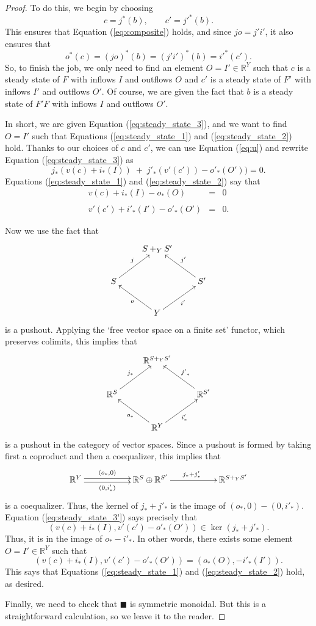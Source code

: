 \documentclass{compositionalityarticle}
\newcommand{\R}{\mathbb{R}}
\theoremstyle{compositionality}
\theoremstyle{remark}
\begin{document}
\begin{proof}
To do this, we begin by choosing
\[   c = j^*(b), \qquad c' = {j'}^*(b) .\]
This ensures that Equation (\ref{eq:composite}) holds, and since $jo = j'i'$, it also ensures that 
\[  o^*(c) = (jo)^*(b) = (j'i')^*(b) = {i'}^*(c')  .\]
So, to finish the job, we only need to find an element $O = I' \in \R^Y$ such that $c$ is a steady state of $F$ with inflows $I$ and outflows $O$ and $c'$ is a steady state of $F'$ with inflows $I'$ and outflows $O'$.  Of course, we are given the fact that $b$ is a steady state of $F'F$ with inflows $I$ and outflows $O'$.   

In short, we are given Equation (\ref{eq:steady_state_3}), and we want to find $O = I'$ such that Equations (\ref{eq:steady_state_1}) and (\ref{eq:steady_state_2}) hold.  Thanks to our choices of $c$ and $c'$,  we can use Equation (\ref{eq:u}) and rewrite Equation (\ref{eq:steady_state_3}) as
\begin{equation}
\label{eq:steady_state_3'}
  j_*(v(c) + i_*(I)) \; + \; {j'}_*(v'(c')) - {o'}_*(O')) = 0 .  
\end{equation}
Equations  (\ref{eq:steady_state_1}) and (\ref{eq:steady_state_2}) say that
\begin{equation}
\label{eq:steady_state_1'2'}
\begin{array}{lcl}
   v(c) + i_*(I) - {o}_*(O) &=& 0 \\  \\
   v'(c') + {i'}_*(I') - {o'}_*(O') &=& 0.
\end{array}
\end{equation}

Now we use the fact that 
\[
    \xymatrix{
      & S +_Y S' \\
       S \ar[ur]^{j} && S' \ar[ul]_{j'} \\
       & Y \ar[ul]^{o} \ar[ur]_{i'} &
    }
\]
is a pushout.  Applying the `free vector space on a finite set' functor, which preserves colimits, this implies that
\[
    \xymatrix{
      & \R^{S +_Y S'} \\
       \R^S \ar[ur]^{j_*} && \R^{S'} \ar[ul]_{{j'}_*} \\
       & \R^Y \ar[ul]^{o_*} \ar[ur]_{i'_*} &
    }
\]
is a pushout in the category of vector spaces.   Since a pushout is formed by taking first a coproduct and then a coequalizer, this implies that 
\[
     \xymatrix{
      \R^Y \ar@<-.5ex>[rr]_-{(0,i'_*)} \ar@<.5ex>[rr]^-{(o_*,0)} && \R^S \oplus \R^{S'} \ar[rr]^{j_* + j'_*}
   && \R^{S +_Y S'}
}
\]
is a coequalizer.  Thus, the kernel of $j_* + j'_*$ is the image of $(o_*,0) - (0,i'_*)$.   Equation (\ref{eq:steady_state_3'}) says precisely that 
\[    (v(c) + i_*(I), v'(c') - o'_*(O')) \in \ker(j_* + j'_*)  .\]
Thus, it is in the image of $o_* - i'_*$.  In other words, there exists some element $O = I' \in \R^Y$
such that 
\[   (v(c) + i_*(I), v'(c') - o'_*(O')) = (o_*(O), -i'_*(I')).\]
This says that Equations (\ref{eq:steady_state_1}) and (\ref{eq:steady_state_2}) hold, as desired.

Finally, we need to check that $\blacksquare$ is symmetric monoidal.  But this is a straightforward calculation, so we leave it to the reader.
\end{proof}
\end{document}
